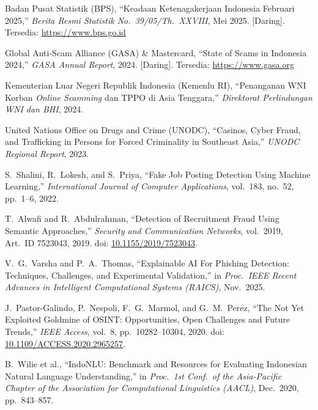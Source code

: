 \documentclass[12pt,a4paper]{article}
\begin{document}
\begingroup
\footnotesize
\begin{enumerate}[label={[\arabic*]}, labelindent=0pt, leftmargin=0.95cm, labelwidth=0.60cm, labelsep=0.35cm, align=left, itemsep=6pt, parsep=0pt, topsep=4pt]

\item Badan Pusat Statistik (BPS), ``Keadaan Ketenagakerjaan Indonesia Februari 2025,''
  \textit{Berita Resmi Statistik No.\ 39/05/Th.\ XXVIII}, Mei 2025. [Daring]. Tersedia: \url{https://www.bps.go.id}

\item Global Anti-Scam Alliance (GASA) \& Mastercard, ``State of Scams in Indonesia 2024,''
  \textit{GASA Annual Report}, 2024. [Daring]. Tersedia: \url{https://www.gasa.org}

\item Kementerian Luar Negeri Republik Indonesia (Kemenlu RI), ``Penanganan WNI Korban
  \textit{Online Scamming} dan TPPO di Asia Tenggara,'' \textit{Direktorat Perlindungan WNI dan BHI},
  2024.

\item United Nations Office on Drugs and Crime (UNODC), ``Casinos, Cyber Fraud, and Trafficking
  in Persons for Forced Criminality in Southeast Asia,'' \textit{UNODC Regional Report}, 2023.

\item S.\ Shalini, R.\ Lokesh, and S.\ Priya, ``Fake Job Posting Detection Using Machine
  Learning,'' \textit{International Journal of Computer Applications}, vol.\ 183, no.\ 52,
  pp.\ 1--6, 2022.

\item T.\ Alwafi and R.\ Abdulrahman, ``Detection of Recruitment Fraud Using Semantic
  Approaches,'' \textit{Security and Communication Networks}, vol.\ 2019, Art.\ ID 7523043, 2019.
  doi: \href{https://doi.org/10.1155/2019/7523043}{10.1155/2019/7523043}.

\item V.\ G.\ Varsha and P.\ A.\ Thomas, ``Explainable AI For Phishing Detection: Techniques,
  Challenges, and Experimental Validation,'' in \textit{Proc.\ IEEE Recent Advances in
  Intelligent Computational Systems (RAICS)}, Nov.\ 2025.

\item J.\ Pastor-Galindo, P.\ Nespoli, F.\ G.\ Marmol, and G.\ M.\ Perez, ``The Not Yet
  Exploited Goldmine of OSINT: Opportunities, Open Challenges and Future Trends,''
  \textit{IEEE Access}, vol.\ 8, pp.\ 10282--10304, 2020.
  doi: \href{https://doi.org/10.1109/ACCESS.2020.2965257}{10.1109/ACCESS.2020.2965257}.

\item B.\ Wilie et al., ``IndoNLU: Benchmark and Resources for Evaluating Indonesian Natural
  Language Understanding,'' in \textit{Proc.\ 1st Conf.\ of the Asia-Pacific Chapter of the
  Association for Computational Linguistics (AACL)}, Dec.\ 2020, pp.\ 843--857.

\end{enumerate}
\endgroup
\end{document}
